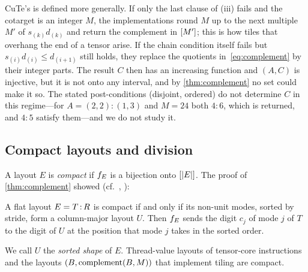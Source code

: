 \begin{remark}\label{rem:nontiling}
CuTe's  is defined more generally. If only the last clause of (iii) fails and
the cotarget is an integer $M$, the implementations round $M$ up to the next multiple $M'$ of
$s_{(k)}d_{(k)}$ and return the complement in $[M']$; this is how tiles that overhang the end of a tensor arise. If the
chain condition itself fails but $s_{(i)}d_{(i)}\le d_{(i+1)}$ still holds, they replace the
quotients in~\eqref{eq:complement} by their integer parts. The result $C$ then has an increasing
function and $(A,C)$ is injective, but it is not onto any interval, and by \cref{thm:complement}
no set could make it so. The stated post-conditions (disjoint, ordered) do not determine $C$ in
this regime---for $A=(2,2):(1,3)$ and $M=24$ both $4:6$, which is returned, and $4:5$ satisfy
them---and we do not study it.
\end{remark}

\subsection{Compact layouts and division}

A layout $E$ is \emph{compact} if $f_{E}$ is a bijection onto $[|E|]$. The proof of
\cref{thm:complement} showed (cf.~\cite[Prop.~2.1.5.6]{carlisle2026}, \cite[\S3]{shah2024}):

\begin{lemma}\label{lem:compact}
A flat layout $E=T\,{:}\,R$ is compact if and only if its non-unit modes, sorted by stride, form a
column-major layout $U$. Then $f_{E}$ sends the digit $c_j$ of mode $j$ of $T$ to the digit of
$U$ at the position that mode $j$ takes in the sorted order.
\end{lemma}
\noindent We call $U$ the \emph{sorted shape} of $E$. Thread-value layouts of tensor-core
instructions and the layouts $(B,\operatorname{complement}(B,M))$ that implement tiling are compact.

